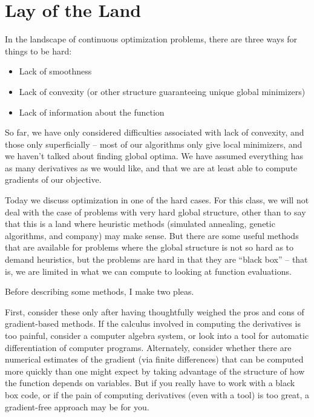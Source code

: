 \documentclass[12pt, leqno]{article} %
\providecommand{\tightlist}{%
  \setlength{\itemsep}{0pt}\setlength{\parskip}{0pt}}
\begin{document}

\section{Lay of the Land}

In the landscape of continuous optimization problems, there are three
ways for things to be hard:

\begin{itemize}
\tightlist
\item
  Lack of smoothness
\item
  Lack of convexity (or other structure guaranteeing unique global
  minimizers)
\item
  Lack of information about the function
\end{itemize}

So far, we have only considered difficulties associated with lack of
convexity, and those only superficially -- most of our algorithms only
give local minimizers, and we haven't talked about finding global
optima. We have assumed everything has as many derivatives as we would
like, and that we are at least able to compute gradients of our
objective.

Today we discuss optimization in one of the hard cases. For this class,
we will not deal with the case of problems with very hard global
structure, other than to say that this is a land where heuristic methods
(simulated annealing, genetic algorithms, and company) may make sense.
But there are some useful methods that are available for problems where
the global structure is not so hard as to demand heuristics, but the
problems are hard in that they are ``black box'' -- that is, we are
limited in what we can compute to looking at function evaluations.

Before describing some methods, I make two pleas.

First, consider these only after having thoughtfully weighed the pros
and cons of gradient-based methods. If the calculus involved in
computing the derivatives is too painful, consider a computer algebra
system, or look into a tool for automatic differentiation of computer
programs. Alternately, consider whether there are numerical estimates of
the gradient (via finite differences) that can be computed more quickly
than one might expect by taking advantage of the structure of how the
function depends on variables. But if you really have to work with a
black box code, or if the pain of computing derivatives (even with a
tool) is too great, a gradient-free approach may be for you.
\end{document}
